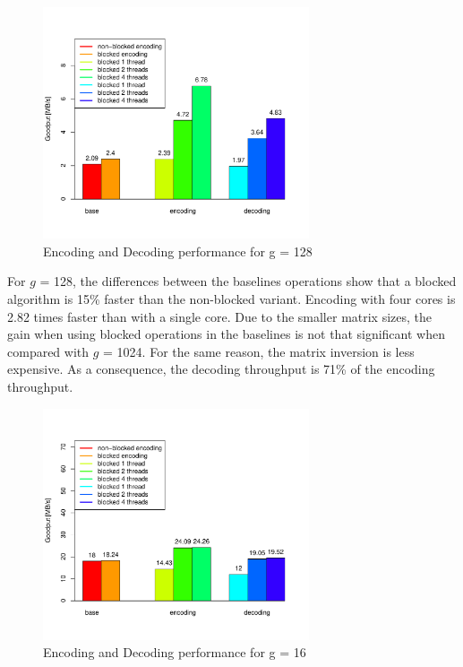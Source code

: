 \begin{figure}[ht!]
\centering
\includegraphics[width=0.7\textwidth]{images/2015-04-18_encoding_decoding_128.pdf}
\caption{Encoding and Decoding performance for g = 128 \cite{wunderlich2015network}}
\label{enc_dec128}
\end{figure}

For $g$ = 128, the differences between the baselines operations show that a
blocked algorithm is 15\% faster than the non-blocked variant. Encoding with
four cores is 2.82 times faster than with a single core. Due to the smaller
matrix sizes, the gain when using blocked operations in the baselines is not
that significant when compared with $g$ = 1024. For the same reason, the matrix
inversion is less expensive. As a consequence, the decoding throughput is 71\%
of the encoding throughput.

\begin{figure}[ht!]
\centering
\includegraphics[width=0.7\textwidth]{images/2015-04-18_encoding_decoding_16.pdf}
\caption{Encoding and Decoding performance for g = 16 \cite{wunderlich2015network}}
\label{enc_dec16}
\end{figure}

